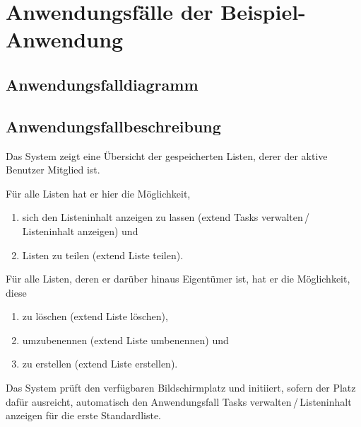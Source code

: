 
\chapter{Anwendungsfälle der Beispiel-Anwendung}

\pagebreak
{}
\section{Anwendungsfalldiagramm}


\restoregeometry
\pagebreak

\section{Anwendungsfallbeschreibung}



	\begin{description}
	
		
		\begin{verlauf}
		
		\item Das System zeigt eine Übersicht der gespeicherten Listen, derer der aktive Benutzer Mitglied ist.
		\item Für alle Listen hat er hier die Möglichkeit,
			\begin{enumerate}
			\item sich den Listeninhalt anzeigen zu lassen (extend Tasks verwalten\,/\,Listeninhalt anzeigen) und 
			\item Listen zu teilen (extend Liste teilen). 
			\end{enumerate}
		\item Für alle Listen, deren er darüber hinaus Eigentümer ist, hat er die Möglichkeit, diese 
			\begin{enumerate}
			\item zu löschen (extend Liste löschen), 
			\item umzubenennen (extend Liste umbenennen) und
			\item zu erstellen (extend Liste erstellen).
			\end{enumerate}
		\item Das System prüft den verfügbaren Bildschirmplatz und initiiert, sofern der Platz dafür ausreicht, automatisch den Anwendungsfall Tasks verwalten\,/\,Listeninhalt anzeigen für die erste Standardliste.
		\end{verlauf}
	
	\end{description}

